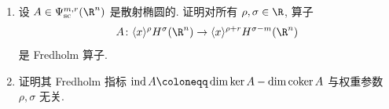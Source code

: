 \begin{exer}\label{ex:4.22}
\begin{enumerate}
    \item 设 $A \in \Psi_{\mathrm{sc}}^{m, r}(\R^n)$ 是散射椭圆的. 证明对所有 $\rho, \sigma \in \R$, 算子
    \begin{equation}\label{eq:4.179}
        A \colon \langle x \rangle^\rho H^\sigma(\R^n) \to \langle x \rangle^{\rho+r} H^{\sigma-m}(\R^n)
    \end{equation}
    是 Fredholm 算子.
    \item 证明其 Fredholm 指标 $\operatorname{ind} A \defeq \dim\ker A - \dim\operatorname{coker} A$ 与权重参数 $\rho, \sigma$ 无关.
\end{enumerate}
\end{exer}
